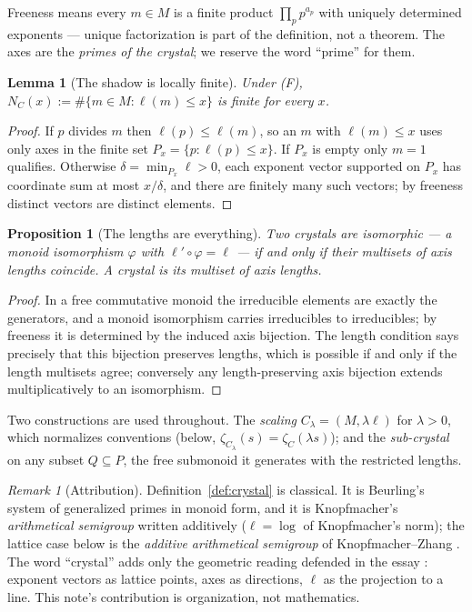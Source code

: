\documentclass[11pt]{article}
\newtheorem{lemma}{Lemma}
\newtheorem{proposition}{Proposition}
\theoremstyle{remark}
\newtheorem{remark}{Remark}
\begin{document}
Freeness means every $m \in M$ is a finite product $\prod_p p^{a_p}$ with uniquely determined
exponents --- unique factorization is part of the definition, not a theorem. The axes are the
\emph{primes of the crystal}; we reserve the word ``prime'' for them.

\begin{lemma}[The shadow is locally finite]\label{lem:locfin}
Under \emph{(F)}, $N_C(x) := \#\{ m \in M : \ell(m) \le x \}$ is finite for every $x$.
\end{lemma}

\begin{proof}
If $p$ divides $m$ then $\ell(p) \le \ell(m)$, so an $m$ with $\ell(m) \le x$ uses only axes in the
finite set $P_x = \{p : \ell(p) \le x\}$. If $P_x$ is empty only $m = 1$ qualifies. Otherwise
$\delta = \min_{P_x} \ell > 0$, each exponent vector supported on $P_x$ has coordinate sum at most
$x/\delta$, and there are finitely many such vectors; by freeness distinct vectors are distinct
elements.
\end{proof}

\begin{proposition}[The lengths are everything]\label{prop:iso}
Two crystals are isomorphic --- a monoid isomorphism $\varphi$ with $\ell' \circ \varphi = \ell$ ---
if and only if their multisets of axis lengths coincide. A crystal \emph{is} its multiset of axis
lengths.
\end{proposition}

\begin{proof}
In a free commutative monoid the irreducible elements are exactly the generators, and a monoid
isomorphism carries irreducibles to irreducibles; by freeness it is determined by the induced axis
bijection. The length condition says precisely that this bijection preserves lengths, which is
possible if and only if the length multisets agree; conversely any length-preserving axis bijection
extends multiplicatively to an isomorphism.
\end{proof}

Two constructions are used throughout. The \emph{scaling} $C_\lambda = (M, \lambda\ell)$ for
$\lambda > 0$, which normalizes conventions (below, $\zeta_{C_\lambda}(s) = \zeta_C(\lambda s)$);
and the \emph{sub-crystal} on any subset $Q \subseteq P$, the free submonoid it generates with the
restricted lengths.

\begin{remark}[Attribution]\label{rem:attrib}
Definition~\ref{def:crystal} is classical. It is Beurling's system of generalized primes
\cite{Beurling, DiamondZhang} in monoid form, and it is Knopfmacher's \emph{arithmetical semigroup}
\cite{Knopfmacher} written additively ($\ell = \log$ of Knopfmacher's norm); the lattice case below
is the \emph{additive arithmetical semigroup} of Knopfmacher--Zhang \cite{KnopfmacherZhang}. The
word ``crystal'' adds only the geometric reading defended in the essay \cite{Essay}: exponent
vectors as lattice points, axes as directions, $\ell$ as the projection to a line. This note's
contribution is organization, not mathematics.
\end{remark}
\end{document}
